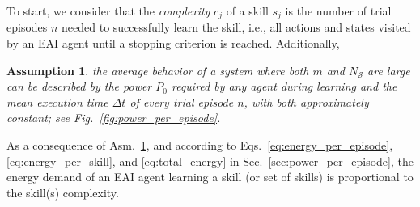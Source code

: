 \documentclass[12pt]{article}
\renewcommand{\emph}[1]{\textit{#1}}
\newtheorem{assumption}{Assumption}
\begin{document}
To start, we consider that the \emph{complexity} $c_j$ of a skill $ s_j $ is the number of trial episodes $n$ needed to successfully learn the skill, i.e., all actions and states visited by an EAI agent until a stopping criterion is reached. Additionally, %
\begin{tcolorbox}
	\begin{assumption}\label{assumption:power_and_episode_time}
		the average behavior of a system where both $m$ and $N_\mathcal{S}$ are large can be described by the power $P_0$ required by any agent during learning and the mean execution time $\Delta t$ of every trial episode $n$, with both approximately constant; see Fig.~\ref{fig:power_per_episode}.
	\end{assumption}
\end{tcolorbox}
\noindent As a consequence of Asm.~\ref{assumption:power_and_episode_time}, and according to Eqs.~\eqref{eq:energy_per_episode},\eqref{eq:energy_per_skill}, and \eqref{eq:total_energy} in Sec.~\ref{sec:power_per_episode}, the energy demand of an EAI agent learning a skill (or set of skills) is proportional to the skill(s) complexity.

\end{document}
